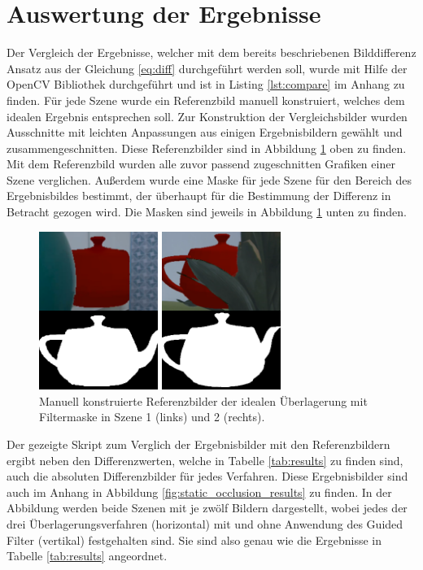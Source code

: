\section{Auswertung der Ergebnisse}

Der Vergleich der Ergebnisse, welcher mit dem bereits beschriebenen Bilddifferenz Ansatz aus der Gleichung \ref{eq:diff} durchgeführt werden soll, wurde mit Hilfe der OpenCV Bibliothek durchgeführt und ist in Listing \ref{lst:compare} im Anhang zu finden. Für jede Szene wurde ein Referenzbild manuell konstruiert, welches dem idealen Ergebnis entsprechen soll. Zur Konstruktion der Vergleichsbilder wurden Ausschnitte mit leichten Anpassungen aus einigen Ergebnisbildern gewählt und zusammengeschnitten. Diese Referenzbilder sind in Abbildung \ref{fig:reference} oben zu finden. Mit dem Referenzbild wurden alle zuvor passend zugeschnitten Grafiken einer Szene verglichen. Außerdem wurde eine Maske für jede Szene für den Bereich des Ergebnisbildes bestimmt, der überhaupt für die Bestimmung der Differenz in Betracht gezogen wird. Die Masken sind jeweils in Abbildung \ref{fig:reference} unten zu finden.

\begin{figure}[h]
  \centering
	\includegraphics[width=0.7\textwidth]{content/images/evaluation/reference.png} 
  \caption{Manuell konstruierte Referenzbilder der idealen Überlagerung mit Filtermaske in Szene 1 (links) und 2 (rechts).}
  \label{fig:reference}
\end{figure}

Der gezeigte Skript zum Verglich der Ergebnisbilder mit den Referenzbildern ergibt neben den Differenzwerten, welche in Tabelle \ref{tab:results} zu finden sind, auch die absoluten Differenzbilder für jedes Verfahren. Diese Ergebnisbilder sind auch im Anhang in Abbildung \ref{fig:static_occlusion_results} zu finden. In der Abbildung werden beide Szenen mit je zwölf Bildern dargestellt, wobei jedes der drei Überlagerungsverfahren (horizontal) mit und ohne Anwendung des Guided Filter (vertikal) festgehalten sind. Sie sind also genau wie die Ergebnisse in Tabelle \ref{tab:results} angeordnet.



